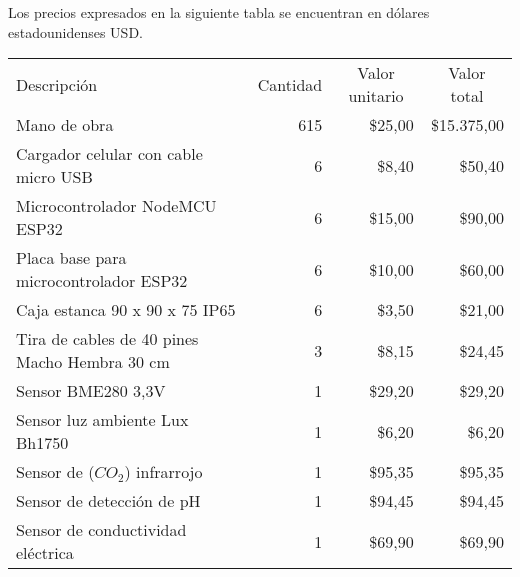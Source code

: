 Los precios expresados en la siguiente tabla se encuentran en dólares estadounidenses USD.

\begin{table}[htpb]
	\centering
	\begin{tabularx}{\linewidth}{@{}|X|c|r|r|@{}}
		\hline
		\rowcolor[HTML]{C0C0C0}
		\multicolumn{4}{|c|}{\cellcolor[HTML]{C0C0C0}COSTOS DIRECTOS}   \\ \hline
		\rowcolor[HTML]{C0C0C0}
		Descripción & \multicolumn{1}{c|}{\cellcolor[HTML]{C0C0C0}Cantidad} & 
		\multicolumn{1}{c|}{\cellcolor[HTML]{C0C0C0}Valor unitario} &
		\multicolumn{1}{c|}{\cellcolor[HTML]{C0C0C0}Valor total}\\ \hline
		Mano de obra & 
		\multicolumn{1}{r|}{615} & \multicolumn{1}{r|}{\$25,00} & \multicolumn{1}{r|}{\$15.375,00} \\ \hline
		Cargador celular con cable micro USB & 
		\multicolumn{1}{r|}{6} & \multicolumn{1}{r|}{\$8,40} & \multicolumn{1}{r|}{\$50,40} \\ \hline
		Microcontrolador NodeMCU ESP32 & 
		\multicolumn{1}{r|}{6} & \multicolumn{1}{r|}{\$15,00} & \multicolumn{1}{r|}{\$90,00} \\ \hline
		Placa base para microcontrolador ESP32 & 
		\multicolumn{1}{r|}{6} & \multicolumn{1}{r|}{\$10,00} & \multicolumn{1}{r|}{\$60,00} \\ \hline
		Caja estanca 90 x 90 x 75 IP65 & 
		\multicolumn{1}{r|}{6} & \multicolumn{1}{r|}{\$3,50} & \multicolumn{1}{r|}{\$21,00} \\ \hline
		Tira de cables de 40 pines Macho Hembra 30 cm & 
		\multicolumn{1}{r|}{3} & \multicolumn{1}{r|}{\$8,15} & \multicolumn{1}{r|}{\$24,45} \\ \hline
		Sensor BME280 3,3V & 
		\multicolumn{1}{r|}{1} & \multicolumn{1}{r|}{\$29,20} & \multicolumn{1}{r|}{\$29,20} \\ \hline
		Sensor luz ambiente Lux Bh1750 & 
		\multicolumn{1}{r|}{1} & \multicolumn{1}{r|}{\$6,20} & \multicolumn{1}{r|}{\$6,20} \\ \hline
		Sensor de ($CO_2$) infrarrojo  & 
		\multicolumn{1}{r|}{1} & \multicolumn{1}{r|}{\$95,35} & \multicolumn{1}{r|}{\$95,35} \\ \hline
		Sensor de detección de pH  & 
		\multicolumn{1}{r|}{1} & \multicolumn{1}{r|}{\$94,45} & \multicolumn{1}{r|}{\$94,45} \\ \hline
		Sensor de conductividad eléctrica   & 
		\multicolumn{1}{r|}{1} & \multicolumn{1}{r|}{\$69,90} & \multicolumn{1}{r|}{\$69,90} \\ \hline

\end{tabularx}
\end{table}
